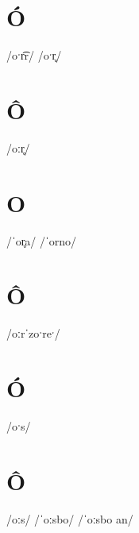 \documentclass[10pt,a4paper,twoside]{book}
\begin{document}
\section*{Ó}

\begin{multicols}{3}
 {/oˑr͡r/} {}
 {/oˑr̥/} {}
\end{multicols}

\section*{Ô}

\begin{multicols}{3}
 {/oːr̥/} {}
\end{multicols}

\section*{O}

\begin{multicols}{3}
 {/ˈor̥a/} {}
 {/ˈorno/} {}
\end{multicols}

\section*{Ô}

\begin{multicols}{3}
 {/oːrˈzoˑreˑ/} {}
\end{multicols}

\section*{Ó}

\begin{multicols}{3}
 {/oˑs/} {}
\end{multicols}

\section*{Ô}

\begin{multicols}{3}
 {/oːs/} {}
 {/ˈoːsbo/} {}
 {/ˈoːsbo an/} {}
\end{multicols}
\end{document}
